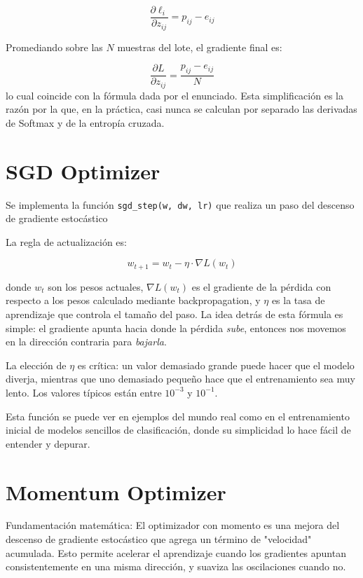 \documentclass[12pt, letterpaper]{article}
\begin{document}
\[
\frac{\partial \ell_i}{\partial z_{ij}} = p_{ij}-e_{ij}
\]

Promediando sobre las $N$ muestras del lote, el gradiente final es:

\[
\frac{\partial L}{\partial z_{ij}} = \frac{p_{ij}-e_{ij}}{N}
\]
lo cual coincide con la fórmula dada por el enunciado. Esta simplificación es la razón por la que, en la práctica, casi nunca se calculan por separado las derivadas de Softmax y de la entropía cruzada.




\newpage

\section{SGD Optimizer}

Se implementa la función \texttt{sgd\_step(w, dw, lr)} que realiza un paso del
descenso de gradiente estocástico

La regla de actualización es:

\[
w_{t+1} = w_t - \eta \cdot \nabla L(w_t)
\]

donde $w_t$ son los pesos actuales, $\nabla L(w_t)$ es el gradiente de la pérdida
con respecto a los pesos calculado mediante backpropagation, y $\eta$ es la tasa
de aprendizaje que controla el tamaño del paso. La idea detrás de esta fórmula
es simple: el gradiente apunta hacia donde la pérdida \textit{sube}, entonces
nos movemos en la dirección contraria para \textit{bajarla}.

La elección de $\eta$ es crítica: un valor demasiado grande puede hacer que el
modelo diverja, mientras que uno demasiado pequeño hace que el entrenamiento sea
muy lento. Los valores típicos están entre $10^{-3}$ y $10^{-1}$.

Esta función se puede ver en ejemplos del mundo real como en el entrenamiento
inicial de modelos sencillos de clasificación, donde su simplicidad lo hace
fácil de entender y depurar.

\newpage

\section{Momentum Optimizer}

Fundamentación matemática: El optimizador con momento es una mejora del descenso de gradiente estocástico que agrega un término de "velocidad" acumulada. Esto permite acelerar el aprendizaje cuando los gradientes apuntan consistentemente en una misma dirección, y suaviza las oscilaciones cuando no.
\end{document}

